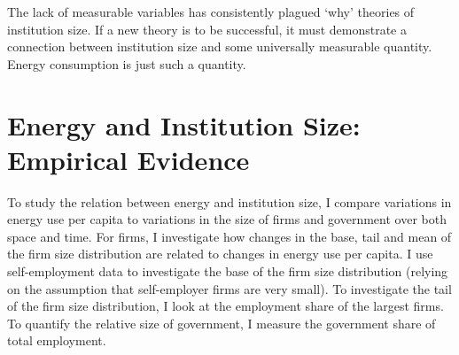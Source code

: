 The lack of measurable variables has consistently plagued `why' theories of institution size. If a new theory is to be successful, it must demonstrate a connection between institution size and some universally measurable quantity. Energy consumption is just such a quantity. 




\section{Energy and Institution Size: Empirical Evidence}
\label{Sec_Evidence}



To study the relation between energy and institution size, I compare variations in energy use per capita  to variations in the size of firms and government over both space and time. For firms, I investigate how changes in the  base, tail and mean of the firm size distribution are related to changes in energy use per capita. I use self-employment data to investigate the base of the firm size distribution (relying on the assumption that self-employer firms are very small). To investigate the tail of the firm size distribution, I look at the employment share of the largest firms. To quantify the relative size of government, I measure the government share of total employment.






